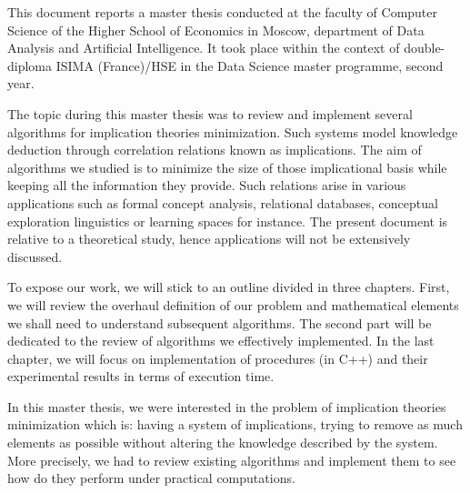 \documentclass[a4paper]{report}
\begin{document}
\tableofcontents



This document reports a master thesis conducted at the faculty of Computer Science of the Higher School of Economics in Moscow, department of Data Analysis and Artificial Intelligence. It took place within the context of double-diploma ISIMA (France)/HSE in the Data Science master programme, second year.

\vspace{1.2em}

The topic during this master thesis was to review and implement several algorithms for implication theories minimization. Such systems model knowledge deduction through correlation relations known as implications. The aim of algorithms we studied is to minimize the size of those implicational basis while
keeping all the information they provide. Such relations arise in various applications such as formal concept analysis, relational databases, conceptual exploration linguistics or learning spaces for instance. The present
document is relative to a theoretical study, hence applications will not be extensively discussed.

\vspace{1.2em}

To expose our work, we will stick to an outline divided in three chapters. First, we will review the overhaul definition of our problem and mathematical elements we shall need to understand subsequent algorithms. The second part will be dedicated to the review of algorithms we effectively implemented. In
the last chapter, we will focus on implementation of procedures (in C++) and their experimental results in terms of execution time.












In this master thesis, we were interested in the problem of implication theories minimization which is: having a system of implications, trying to remove as much elements as possible without altering the knowledge described by
the system. More precisely, we had to review existing algorithms and implement them to see how do they perform under practical computations.
\end{document}
